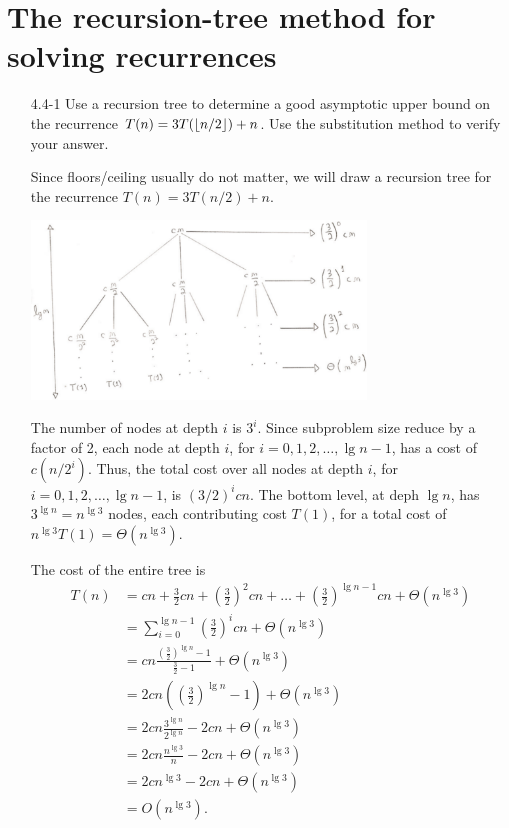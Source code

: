 \newpage

\section{The recursion-tree method for solving recurrences}

\begin{enumerate}

\item[4.4{-}1]{Use a recursion tree to determine a good asymptotic upper bound
on the recurrence $T(n) = 3T(\lfloor n/2\rfloor) + n$. Use the substitution method to
verify your answer.}

\begin{framed}
Since floors/ceiling usually do not matter, we will draw a recursion tree for
the recurrence $T(n) = 3T(n/2) + n$.

\begin{center}
\includegraphics[width=0.7\textwidth]{images/4_4_1_1.pdf}
\end{center}

The number of nodes at depth $i$ is $3^i$. Since subproblem size reduce by
a factor of 2, each node at depth $i$, for $i = 0, 1, 2, \dots, \lg n - 1$,
has a cost of $c (n/2^i)$. Thus, the total cost over all nodes at depth
$i$, for $i = 0, 1, 2, \dots, \lg n - 1$, is $(3/2)^i cn$. The bottom level,
at deph $\lg n$, has $3^{\lg n} = n^{\lg 3}$ nodes, each contributing cost
$T(1)$, for a total cost of $n^{\lg 3} T(1) = \Theta(n^{\lg 3})$.

The cost of the entire tree is
\begin{equation*}
\begin{aligned}
T(n) &= cn + \frac{3}{2} cn + \left(\frac{3}{2}\right)^2 cn + \dots
           + \left(\frac{3}{2}\right)^{\lg n - 1} cn + \Theta\left({n^{\lg 3}}\right)\\
     &= \sum_{i = 0}^{\lg n - 1} \left(\frac{3}{2}\right)^i cn + \Theta(n^{\lg 3})\\
     &= cn \frac{\left(\frac{3}{2}\right)^{\lg n} - 1}{\frac{3}{2} - 1} + \Theta(n^{\lg 3})\\
     &= 2cn \left(\left(\frac{3}{2}\right)^{\lg n} - 1\right) + \Theta(n^{\lg 3})\\
     &= 2cn \frac{3^{\lg n}}{2^{\lg n}} - 2cn + \Theta(n^{\lg 3})\\
     &= 2cn \frac{n^{\lg 3}}{n} - 2cn + \Theta(n^{\lg 3})\\
     &= 2cn^{\lg 3} - 2cn + \Theta(n^{\lg 3})\\
     &= O(n^{\lg 3}).
\end{aligned}
\end{equation*}


\end{framed}
\end{enumerate}
